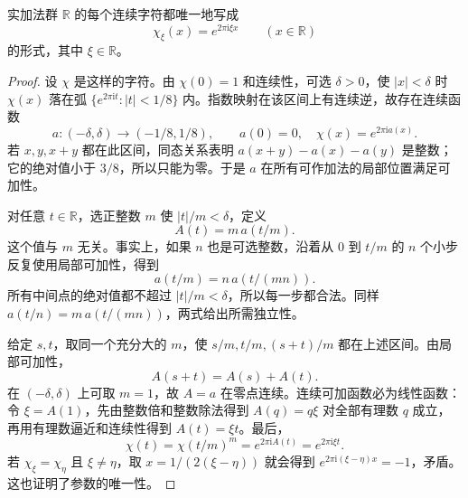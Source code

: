 \begin{proposition}[实直线的字符]
\label{b2:prop:I3-real-characters}
实加法群 \(\mathbb R\) 的每个连续字符都唯一地写成
\[
 \chi_\xi(x)=e^{2\pi\mathrm i\xi x}\qquad(x\in\mathbb R)
\]
的形式，其中 \(\xi\in\mathbb R\)。
\end{proposition}
\begin{proof}
设 \(\chi\) 是这样的字符。由 \(\chi(0)=1\) 和连续性，可选 \(\delta>0\)，使 \(|x|<\delta\) 时 \(\chi(x)\) 落在弧
\(\{e^{2\pi\mathrm it}:|t|<1/8\}\) 内。指数映射在该区间上有连续逆，故存在连续函数
\[
 a:(-\delta,\delta)\longrightarrow(-1/8,1/8),\qquad
 a(0)=0,\quad \chi(x)=e^{2\pi\mathrm ia(x)}.
\]
若 \(x,y,x+y\) 都在此区间，同态关系表明
\(a(x+y)-a(x)-a(y)\) 是整数；它的绝对值小于 \(3/8\)，所以只能为零。于是 \(a\) 在所有可作加法的局部位置满足可加性。

对任意 \(t\in\mathbb R\)，选正整数 \(m\) 使 \(|t|/m<\delta\)，定义
\[
 A(t)=m\,a(t/m).
\]
这个值与 \(m\) 无关。事实上，如果 \(n\) 也是可选整数，沿着从 \(0\) 到 \(t/m\) 的 \(n\) 个小步反复使用局部可加性，得到
\[
 a(t/m)=n\,a(t/(mn)).
\]
所有中间点的绝对值都不超过 \(|t|/m<\delta\)，所以每一步都合法。同样
\(a(t/n)=m\,a(t/(mn))\)，两式给出所需独立性。

给定 \(s,t\)，取同一个充分大的 \(m\)，使 \(s/m,t/m,(s+t)/m\) 都在上述区间。由局部可加性，
\[
 A(s+t)=A(s)+A(t).
\]
在 \((-\delta,\delta)\) 上可取 \(m=1\)，故 \(A=a\) 在零点连续。连续可加函数必为线性函数：令 \(\xi=A(1)\)，先由整数倍和整数除法得到 \(A(q)=q\xi\) 对全部有理数 \(q\) 成立，再用有理数逼近和连续性得到 \(A(t)=\xi t\)。最后，
\[
 \chi(t)=\chi(t/m)^m=e^{2\pi\mathrm iA(t)}=e^{2\pi\mathrm i\xi t}.
\]
若 \(\chi_\xi=\chi_\eta\) 且 \(\xi\ne\eta\)，取 \(x=1/(2(\xi-\eta))\) 就会得到 \(e^{2\pi\mathrm i(\xi-\eta)x}=-1\)，矛盾。这也证明了参数的唯一性。
\end{proof}

